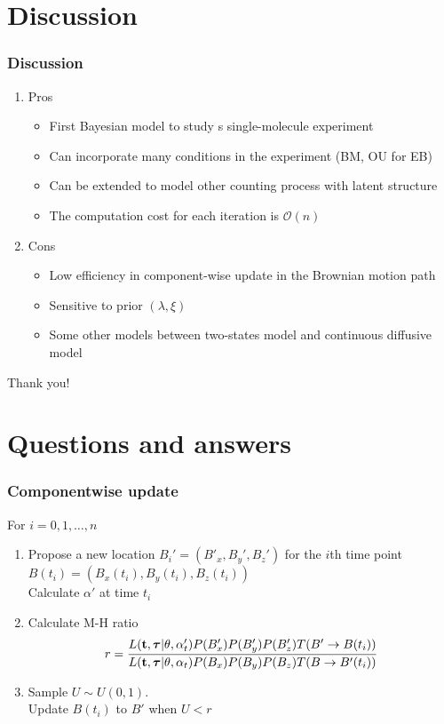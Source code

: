 \documentclass[11pt]{beamer}
\newcommand{\bit}{\begin{itemize}\setlength{\itemsep}{0cm}\setlength{\topsep}{0cm}}
\newcommand{\eit}{\end{itemize}}
\newcommand{\benum}{\begin{enumerate}\setlength{\itemsep}{0cm}\setlength{\parsep
}{0cm}}
\newcommand{\eenum}{\end{enumerate}}
\newcommand{\btau}{{\boldsymbol{\tau}}}
\newcommand{\bt}{{\bf t}}
\begin{document}
\section{Discussion}
\begin{frame}
\frametitle{Discussion}
\benum
\item Pros
\bit 
\item First Bayesian model to study s single-molecule experiment
\item Can incorporate many conditions in the experiment (BM, OU for EB)
\item Can be extended to model other counting process with latent structure
\item The computation cost for each iteration is $\mathcal{O}(n)$
\eit
\item Cons
\bit
\item Low efficiency in component-wise update in the Brownian motion path 
\item Sensitive to prior $(\lambda,\xi)$ 
\item Some other models between two-states model and continuous diffusive model 
\eit
\eenum
\end{frame}
\begin{frame}
\begin{center}
{\Huge Thank you!}
\end{center}

\end{frame}
\section{Questions and answers}
\begin{frame}
	\frametitle{Componentwise update}
	For $i=0,1,\ldots,n$
	\benum
	\pause
	\item Propose a new location $B_i'=(B'_x,B_y',B_z')$ for the $i$th time point $B(t_i)=(B_x(t_i),B_y(t_i),B_z(t_i))$\\
	Calculate $\alpha'$ at time $t_i$
	\pause
	\item Calculate M-H ratio
	$$r=\dfrac{L(\bt,\btau|\theta,\alpha'_t)P(B'_x)P(B'_y)P(B'_z)T(B'\rightarrow B(t_i))}{L(\bt,\btau|\theta,\alpha_t)P(B_x)P(B_y)P(B_z)T(B\rightarrow B'(t_i))}$$
	\item Sample $U\sim U(0,1)$. \\
	Update $B(t_i)$ to $B'$ when $U<r$
	\eenum
\end{frame}
\end{document}
